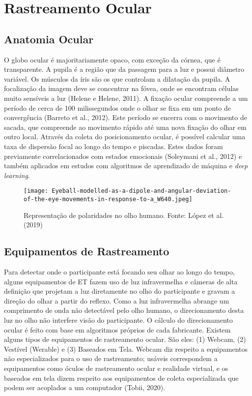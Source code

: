 \chapter{Rastreamento Ocular}

\section{Anatomia Ocular}
O globo ocular é majoritariamente opaco, com exceção da córnea, que é transparente. 
A pupila é a região que da passagem para a luz e possui diâmetro variável. Os músculos da íris são os que controlam a dilatação da pupila. 
A focalização da imagem deve se concentrar na fóvea, onde se encontram células muito sensíveis a luz (Helene e Helene, 2011). 
A fixação ocular compreende a um período de cerca de 100 milissegundos onde o olhar se fixa em um ponto de convergência (Barreto et al., 2012). 
Este período se encerra com o movimento de sacada, que compreende ao movimento rápido até uma nova fixação do olhar em outro local.
Através da coleta do posicionamento ocular, é possível calcular uma taxa de dispersão focal ao longo do tempo e piscadas. 
Estes dados foram previamente correlacionados com estados emocionais (Soleymani et al., 2012) e 
também aplicados em estudos com algoritmos de aprendizado de máquina e \textit{deep learning}. 



\begin{figure}[h]
    \centering
    \texttt{[image: Eyeball-modelled-as-a-dipole-and-angular-deviation-of-the-eye-movements-in-response-to-a\_W640.jpeg]}
    \caption[]{Representação de polaridades no olho humano. Fonte:  López et al. (2019)}\label{fig:}
    \end{figure}

\section{Equipamentos de Rastreamento}
Para detectar onde o participante está focando seu olhar ao longo do tempo, alguns equipamentos de ET
 fazem uso de luz infravermelha e câmeras de alta definição que projetam a luz
  diretamente no olho do participante e gravam a direção do olhar a partir do reflexo. 
  Como a luz infravermelha abrange um comprimento de onda não detectável pelo olho humano, 
  o direcionamento desta luz no olho não interfere visão do participante. 
  O cálculo do direcionamento ocular é feito com base em algoritmos próprios de cada fabricante. 
  Existem alguns tipos de equipamentos de rastreamento ocular. São eles: (1) Webcam, (2) Vestível (Werable) e (3) Baseados em Tela. 
  Webcam diz respeito a equipamentos não especializados para o uso de rastreamento; usáveis correspondem a equipamentos como óculos de rastreamento ocular 
  e realidade virtual, e os baseados em tela dizem respeito aos equipamentos de coleta especializada que podem 
  ser acoplados a um computador (Tobii, 2020).


